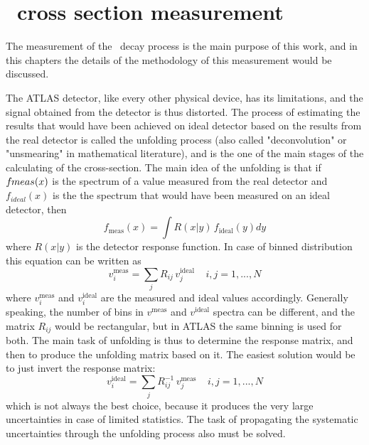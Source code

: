 \chapter{\Zee\ cross section measurement}
\label{sec:ZeeCrossSec}

The measurement of the \Zee\ decay process is the main purpose of this work, and in this chapters the details of the methodology of this measurement would be discussed.

The ATLAS detector, like every other physical device, has its limitations, and the signal obtained from the detector is thus distorted. The process of estimating the results that would have been achieved on ideal detector based on the results from the real detector is called the unfolding process (also called "deconvolution" or "unsmearing" in mathematical literature), and is the one of the main stages of the calculating of the cross-section. The main idea of the unfolding is that if $f_\mathrm\mathrm{meas}(x)$ is the spectrum of a value measured from the real detector and $f_{ideal}(x)$ is the the spectrum that would have been measured on an ideal detector, then
\begin{equation}
f_\mathrm{meas}(x) = \int R(x|y) \, f_\mathrm{ideal}(y)dy
\end{equation}
where $R(x|y)$ is the detector response function. In case of binned distribution this equation can be written as
\begin{equation}
v^\mathrm{meas}_i = \sum_j R_{ij} \, v^\mathrm{ideal}_j \:\:\:\:\: i,j = 1, ... ,N
\end{equation}
where $v^\mathrm{meas}_i$ and $v^\mathrm{ideal}_i$ are the measured and ideal values accordingly. Generally speaking, the number of bins in $v^\mathrm{meas}$ and $v^\mathrm{ideal}$ spectra can be different, and the matrix $R_{ij}$ would be rectangular, but in ATLAS the same binning is used for both. The main task of unfolding is thus to determine the response matrix, and then to produce the unfolding matrix based on it. The easiest solution would be to just invert the response matrix:
\begin{equation}
v^\mathrm{ideal}_i = \sum_j R^{-1}_{ij} \, v^\mathrm{meas}_j \:\:\:\:\: i,j = 1, ... ,N
\end{equation}
which is not always the best choice, because it produces the very large uncertainties in case of limited statistics. The task of propagating the systematic uncertainties through the unfolding process also must be solved.

